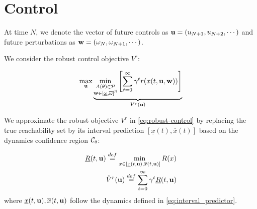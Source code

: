 \documentclass{article}
\begin{document}


\section{Control}

At time $N$, we denote the vector of future controls as $\mathbf{u} = (u_{N+1},u_{N+2},\cdots)$ and future perturbations as $\mathbf{w} = (\omega_N, \omega_{N+1},\cdots)$.

We consider the robust control objective $V^r$:

\begin{equation}
\label{eq:robust-control}
\max_{\mathbf{u}} \underbrace{\min_{\substack{A(\theta) \in \mathcal{P} \\ \mathbf{w}\in[\underline{\omega},\overline{\omega}]^{\mathbb{N}}}} \left[\sum_{t=0}^\infty \gamma^t r(x(t,\mathbf{u},\mathbf{w}))\right]}_{V^r(\mathbf{u})}
\end{equation}


\begin{definition}
We approximate the robust objective $V^r$ in \eqref{eq:robust-control} by replacing the true reachability set by its interval prediction $[\underline{x}(t), \overline{x}(t)]$ based on the dynamics confidence region $\mathcal{C}_\delta$:

\begin{align}
\underline{R}(t,\mathbf{u}) \stackrel{def}{=} \min_{x\in[\underline{x}(t, \mathbf{u}), \overline{x}(t, \mathbf{u})]}  R(x) \\
\hat{V}^r(\mathbf{u}) \stackrel{def}{=} \sum_{t=0}^\infty \gamma^t \underline{R}(t,\mathbf{u}) \label{eq:surrogate_objective}
\end{align}
where $\underline{x}(t, \mathbf{u}), \overline{x}(t, \mathbf{u})$ follow the dynamics defined in \eqref{eq:interval_predictor}.
\end{definition}
\end{document}
